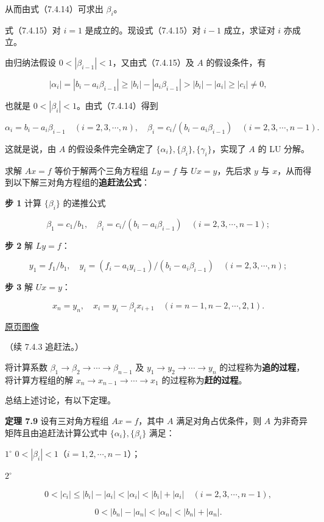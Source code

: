 \documentclass[
  10pt,
  fontset=fandol]{ctexart}
\begin{document}
从而由式（7.4.14）可求出 \(\beta_i\)。

式（7.4.15）对 \(i=1\) 是成立的。现设式（7.4.15）对 \(i-1\) 成立，求证对 \(i\) 亦成立。

由归纳法假设 \(0<|\beta_{i-1}|<1\)，又由式（7.4.15）及 \(A\) 的假设条件，有

\[
|\alpha_i|=|b_i-a_i\beta_{i-1}|\geqslant|b_i|-|a_i\beta_{i-1}|>|b_i|-|a_i|\geqslant|c_i|\neq0,
\]

也就是 \(0<|\beta_i|<1\)。由式（7.4.14）得到

\[
\alpha_i=b_i-a_i\beta_{i-1}\quad(i=2,3,\cdots,n),\quad
\beta_i=c_i/(b_i-a_i\beta_{i-1})\quad(i=2,3,\cdots,n-1).
\]

这就是说，由 \(A\) 的假设条件完全确定了 \(\{\alpha_i\},\{\beta_i\},\{\gamma_i\}\)，实现了 \(A\) 的 LU 分解。

求解 \(Ax=f\) 等价于解两个三角方程组 \(Ly=f\) 与 \(Ux=y\)，先后求 \(y\) 与 \(x\)，从而得到以下解三对角方程组的\textbf{追赶法公式}：

\textbf{步 1} 计算 \(\{\beta_i\}\) 的递推公式

\[
\beta_1=c_1/b_1,\quad\beta_i=c_i/(b_i-a_i\beta_{i-1})\quad(i=2,3,\cdots,n-1);
\]

\textbf{步 2} 解 \(Ly=f\)：

\[
y_1=f_1/b_1,\quad y_i=(f_i-a_iy_{i-1})/(b_i-a_i\beta_{i-1})\quad(i=2,3,\cdots,n);
\]

\textbf{步 3} 解 \(Ux=y\)：

\[
x_n=y_n,\quad x_i=y_i-\beta_ix_{i+1}\quad(i=n-1,n-2,\cdots,2,1).
\]

\href{../../source-images/pdf-199.jpeg}{原页图像}

（续 7.4.3 追赶法。）

将计算系数 \(\beta_1\to\beta_2\to\cdots\to\beta_{n-1}\) 及 \(y_1\to y_2\to\cdots\to y_n\) 的过程称为\textbf{追的过程}，将计算方程组的解 \(x_n\to x_{n-1}\to\cdots\to x_1\) 的过程称为\textbf{赶的过程}。

总结上述讨论，有以下定理。

\textbf{定理 7.9} 设有三对角方程组 \(Ax=f\)，其中 \(A\) 满足对角占优条件，则 \(A\) 为非奇异矩阵且由追赶法计算公式中 \(\{\alpha_i\},\{\beta_i\}\) 满足：

\(1^\circ\) \(0<|\beta_i|<1\)（\(i=1,2,\cdots,n-1\)）；

\(2^\circ\)

\[
0<|c_i|\leqslant|b_i|-|a_i|<|\alpha_i|<|b_i|+|a_i|\quad(i=2,3,\cdots,n-1),
\]

\[
0<|b_n|-|a_n|<|\alpha_n|<|b_n|+|a_n|.
\]
\end{document}
